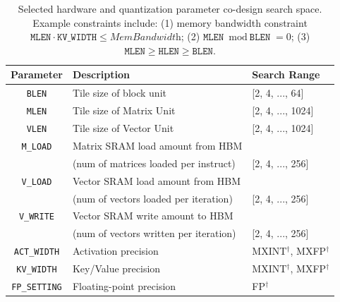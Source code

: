 \begin{table}[h]
\centering
\setlength{\tabcolsep}{2pt}
\renewcommand{\arraystretch}{1}
\caption{Selected hardware and quantization parameter co-design search space. 
Example constraints include: (1) memory bandwidth constraint 
$\texttt{MLEN} \cdot \texttt{KV\_WIDTH} \leq \textit{MemBandwidth}$; 
(2) $\texttt{MLEN} \bmod \texttt{BLEN} = 0$; 
(3) $\texttt{MLEN} \geq \texttt{HLEN} \geq \texttt{BLEN}$.}
\begin{tabular}{cll}
\toprule
\textbf{Parameter} & \textbf{Description} & \textbf{Search Range} \\
\midrule
\texttt{BLEN} & Tile size of block unit & [2, 4, ..., 64] \\
\texttt{MLEN} & Tile size of Matrix Unit & [2, 4, ..., 1024] \\
\texttt{VLEN} & Tile size of Vector Unit & [2, 4, ..., 1024] \\


\texttt{M\_LOAD} & Matrix SRAM load amount from HBM \\[-1pt]
                    & (num of matrices loaded per instruct) & [2, 4, ..., 256] \\
\texttt{V\_LOAD} & Vector SRAM load amount from HBM \\[-1pt]
                    & (num of vectors loaded per iteration) & [2, 4, ..., 256] \\
\texttt{V\_WRITE} & Vector SRAM write amount to HBM \\[-1pt]
                    & (num of vectors written per iteration) & [2, 4, ..., 256] \\
\midrule
\texttt{ACT\_WIDTH} & Activation precision & MXINT$^{\dagger}$, MXFP$^{\dagger}$ \\
\texttt{KV\_WIDTH}  & Key/Value precision & MXINT$^{\dagger}$, MXFP$^{\dagger}$ \\
\texttt{FP\_SETTING} & Floating-point precision & FP$^{\dagger}$ \\ 
\bottomrule
\end{tabular}
\label{tab:design_space}
\vspace{-10pt}
\end{table}






